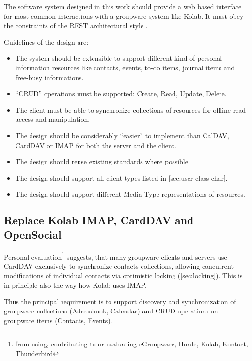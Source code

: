 \documentclass[11pt,a4paper,headsepline,twoside]{scrartcl}		%
\begin{document}
The software system designed in this work should provide a web based interface
for most common interactions with a groupware system like Kolab. It must obey
the constraints of the REST architectural style \cite{Fielding2000}.

Guidelines of the design are:

\begin{itemize}
\item The system should be extensible to support different kind of personal
  information resources like contacts, events, to-do items, journal items and
  free-busy informations.
  \item ``CRUD'' operations must be supported: Create, Read, Update, Delete.
  \item The client must be able to synchronize collections of resources for
    offline read access and manipulation.
  \item The design should be considerably ``easier'' to implement than CalDAV,
    CardDAV or IMAP for both the server and the client.
  \item The design should reuse existing standards where possible.
  \item The design should support all client types listed in
    \autoref{sec:user-class-char}.
  \item The design should support different Media Type representations of
    resources.
\end{itemize}



\subsection{Replace Kolab IMAP, CardDAV and OpenSocial}
\label{sec:replacement-carddav}

Personal evaluation\footnote{from using, contributing to or evaluating
  eGroupware, Horde, Kolab, Kontact, Thunderbird} suggests, that many groupware
clients and servers use CardDAV exclusively to synchronize contacts collections,
allowing concurrent modifications of individual contacts via optimistic locking
(\autoref{sec:locking}). This is in principle also the way how Kolab uses IMAP.

Thus the principal requirement is to support discovery and synchronization of
groupware collections (Adressbook, Calendar) and CRUD operations on groupware
items (Contacts, Events).
\end{document}
